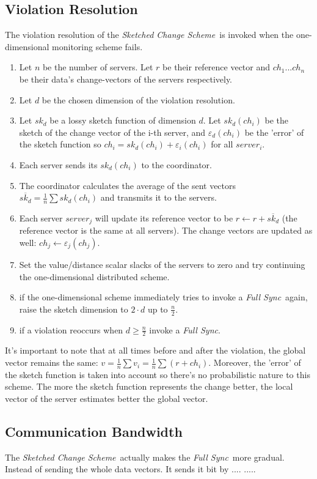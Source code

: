 \documentclass[10pt, conference]{IEEEtran}
\newcommand{\sketchScheme}{\textit{Sketched Change Scheme}}
\newcommand{\fullSync}{\textit{Full Sync}}
\begin{document}
\subsection{Violation Resolution}
The violation resolution of the \sketchScheme \ is invoked when the one-dimensional monitoring scheme fails. 
\begin{enumerate}
\item Let $n$ be the number of servers. Let $r$ be their reference vector and $ch_1 ... ch_n$ be their data's change-vectors of the servers respectively.
\item Let $d$ be the chosen dimension of the violation resolution.
\item Let $sk_d$ be a lossy sketch function of dimension $d$. Let $sk_d (ch_i)$ be the sketch of the change vector of the i-th server, and $\varepsilon _d(ch_i)$ be the 'error' of the sketch function so ${ch_i = sk_d(ch_i) + \varepsilon _i(ch_i)}$ for all $server_i$.
\item Each server sends its $sk_d(ch_i)$ to the coordinator.
\item The coordinator calculates the average of the sent vectors ${\overline{sk_d} = \frac{1}{n}\sum sk_d(ch_i)}$ and transmits it to the servers.
\item Each server $server_j$ will update its reference vector to be ${r \leftarrow r + \overline{sk_d}}$ (the reference vector is the same at all servers). The change vectors are updated as well: ${ch_j \leftarrow \varepsilon _j(ch_j)}$.
\item Set the value/distance scalar slacks of the servers to zero and try continuing the one-dimensional distributed scheme.
\item if the one-dimensional scheme immediately tries to invoke a \fullSync \ again, raise the sketch dimension to $2\cdot d$ up to $\frac{n}{2}$.
\item if a violation reoccurs when ${d \geq \frac{n}{2}}$ invoke a \fullSync .
\end{enumerate} 
It's important to note that at all times before and after the violation, the global vector remains the same: ${v = \frac{1}{n}\sum v_i=\frac{1}{n}\sum (r + ch_i)}$. Moreover, the 'error' of the sketch function is taken into account so there's no probabilistic nature to this scheme. The more the sketch function represents the change better, the local vector of the server estimates better the global vector.
\subsection{Communication Bandwidth}
The \sketchScheme \ actually makes the \fullSync \ more gradual. Instead of sending the whole data vectors. It sends it bit by ....
.....
\end{document}
